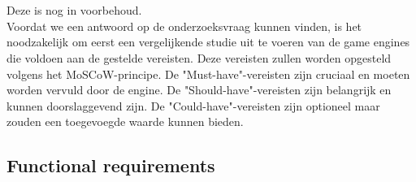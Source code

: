 
\chapter{}%
\label{ch:requirements-analyse}


Deze is nog in voorbehoud. \\

Voordat we een antwoord op de onderzoeksvraag kunnen vinden, is het noodzakelijk om eerst een vergelijkende studie uit te voeren van de game engines die voldoen aan de gestelde vereisten. Deze vereisten zullen worden opgesteld volgens het MoSCoW-principe. De "Must-have"-vereisten zijn cruciaal en moeten worden vervuld door de engine. De "Should-have"-vereisten zijn belangrijk en kunnen doorslaggevend zijn. De "Could-have"-vereisten zijn optioneel maar zouden een toegevoegde waarde kunnen bieden.

\section{Functional requirements}
